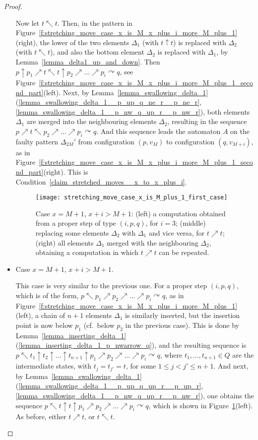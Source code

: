 \documentclass[12pt,a4paper]{article}
\theoremstyle{definition}
\begin{document}
\begin{proof}
\begin{itemize}
	Now let $t \nwarrow t$.
	Then, in the pattern
	in Figure~\ref{f:stretching_move_case_x_is_M_x_plus_i_more_M_plus_1}(right),
	the lower of the two elements $\Delta_1$ (with $t \uparrow t$)
	is replaced with $\Delta_2$ (with $t \nwarrow t$),
	and also the bottom element $\Delta_2$ is replaced with $\Delta_1$,
	by Lemma~\ref{lemma_delta1_up_and_down}.
	Then $p \uparrow p_1 \nearrow t \nwarrow t \uparrow p_2 \nearrow \ldots \nearrow p_i \curvearrowright q$,
	see Figure~\ref{f:stretching_move_case_x_is_M_x_plus_i_more_M_plus_1_second_part}(left).
	Next, by Lemma~\ref{lemma_swallowing_delta_1}(\ref{lemma_swallowing_delta_1__p_up_q_ne_r__p_ne_r},\ref{lemma_swallowing_delta_1__p_nw_q_up_r__p_nw_r}),
	both elements $\Delta_1$ are merged into the neighbouring elements $\Delta_2$,
	resulting in the sequence
	$p \nearrow t \nwarrow p_2 \nearrow \ldots \nearrow p_i \curvearrowright q$.
	And this sequence leads the automaton $A$ on the faulty pattern $\Delta_{2M}'$
	from configuration $(p,v_M)$ to configuration $(q,v_{M+i})$, 
	as in Figure~\ref{f:stretching_move_case_x_is_M_x_plus_i_more_M_plus_1_second_part}(right).
	This is Condition~\ref{claim_stretched_moves__x_to_x_plus_i}.
	
\begin{figure}[t]
	\centerline{\texttt{[image: stretching\_move\_case\_x\_is\_M\_plus\_1\_first\_case]}}
	\caption{Case $x = M+1$, $x+i > M+1$:
	(left) a computation obtained from a proper step of type $(i,p,q)$, for $i=3$;
	(middle) replacing some elements $\Delta_2$ with $\Delta_1$ and vice versa, for $t \nearrow t$;
	(right) all elements $\Delta_1$ merged with the neighbouring $\Delta_2$,
	obtaining a computation in which $t \nearrow t$ can be repeated.}
	\label{f:stretching_move_case_x_is_M_plus_1_first_case}
\end{figure}

\item
	Case $x = M+1$, $x+i > M+1$.
	
	This case is very similar to the previous one.
	For a proper step $(i,p,q)$, which is of the form,
	$p \nwarrow p_1 \nearrow p_2 \nearrow \ldots \nearrow p_i \curvearrowright q$,
	as in Figure~\ref{f:stretching_move_case_x_is_M_x_plus_i_more_M_plus_1}(left),
	a chain of $n+1$ elements $\Delta_1$ is similarly inserted,
	but the insertion point is now below $p_1$
	(cf.\ below $p_2$ in the previous case).
	This is done by Lemma~\ref{lemma_inserting_delta_1}(\ref{lemma_inserting_delta_1_p_nwarrow_q}),
	and the resulting sequence is 
	$p \nwarrow t_1 \uparrow t_2 \uparrow \ldots \uparrow t_{n+1} \uparrow p_1 \nearrow p_2 \nearrow \ldots \nearrow p_i \curvearrowright q$,
	where $t_1, \ldots, t_{n+1} \in Q$ are the intermediate states,
	with $t_j = t_{j'} = t$, for some $1 \leqslant j < j' \leqslant n+1$.
	And next, by Lemma~\ref{lemma_swallowing_delta_1}(\ref{lemma_swallowing_delta_1__p_up_q_up_r__p_up_r},\ref{lemma_swallowing_delta_1__p_nw_q_up_r__p_nw_r}),
	one obtains the sequence 
	$p \nwarrow t \uparrow t \uparrow p_1 \nearrow p_2 \nearrow \ldots \nearrow p_i \curvearrowright q$,
	which is shown in Figure~\ref{f:stretching_move_case_x_is_M_plus_1_first_case}(left).
	As before, either $t \nearrow t$, or $t \nwarrow t$.
	

\end{itemize}
\end{proof}
\end{document}
